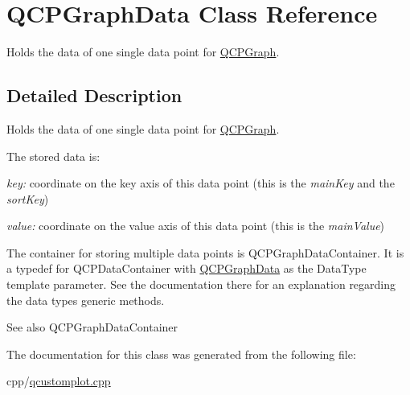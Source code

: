 \hypertarget{class_q_c_p_graph_data}{}\section{Q\+C\+P\+Graph\+Data Class Reference}
\label{class_q_c_p_graph_data}


Holds the data of one single data point for \mbox{\hyperlink{class_q_c_p_graph}{Q\+C\+P\+Graph}}.  




\subsection{Detailed Description}
Holds the data of one single data point for \mbox{\hyperlink{class_q_c_p_graph}{Q\+C\+P\+Graph}}. 

The stored data is\+: \begin{DoxyItemize}
\item {\itshape key\+:} coordinate on the key axis of this data point (this is the {\itshape main\+Key} and the {\itshape sort\+Key}) \item {\itshape value\+:} coordinate on the value axis of this data point (this is the {\itshape main\+Value})\end{DoxyItemize}
The container for storing multiple data points is Q\+C\+P\+Graph\+Data\+Container. It is a typedef for Q\+C\+P\+Data\+Container with \mbox{\hyperlink{class_q_c_p_graph_data}{Q\+C\+P\+Graph\+Data}} as the Data\+Type template parameter. See the documentation there for an explanation regarding the data type\textquotesingle{}s generic methods.

\begin{DoxySeeAlso}{See also}
Q\+C\+P\+Graph\+Data\+Container 
\end{DoxySeeAlso}


The documentation for this class was generated from the following file\+:\begin{DoxyCompactItemize}
\item 
cpp/\mbox{\hyperlink{qcustomplot_8cpp}{qcustomplot.\+cpp}}\end{DoxyCompactItemize}
